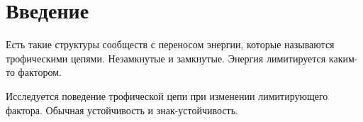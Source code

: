 \section{Введение}
    Есть такие структуры сообществ с переносом энергии, которые называются трофическими цепями. Незамкнутые и замкнутые. Энергия лимитируется каким-то фактором.

    Исследуется поведение трофической цепи при изменении лимитирующего фактора. Обычная устойчивость и знак-устойчивость. 